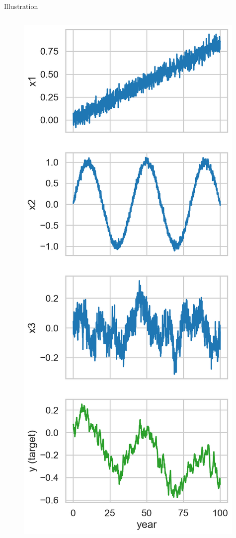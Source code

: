 \documentclass[handout, 10pt]{beamer}
\begin{document}
\begin{frame}{Illustration}
\begin{columns}

   \begin{figure}
    \includegraphics[width=\textwidth]{presentation/course-2/figs/leak_data.png}
    \end{figure}
    

\end{columns}
\end{frame}
\end{document}
